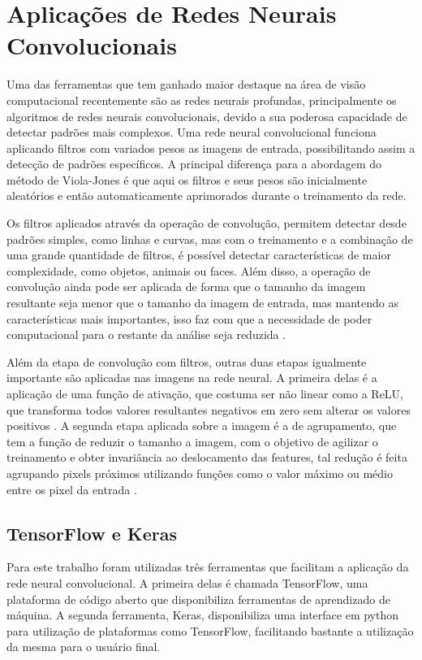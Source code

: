 \section{Aplicações de Redes Neurais Convolucionais}

Uma das ferramentas que tem ganhado maior destaque na área de visão computacional recentemente são as redes neurais profundas, principalmente os algoritmos de redes neurais convolucionais, devido a sua poderosa capacidade de detectar padrões mais complexos. \cite{gu2018recent} Uma rede neural convolucional funciona aplicando filtros com variados pesos as imagens de entrada, possibilitando assim a detecção de padrões específicos. A principal diferença para a abordagem do método de Viola-Jones é que aqui os filtros e seus pesos são inicialmente aleatórios e então automaticamente aprimorados durante o treinamento da rede.

Os filtros aplicados através da operação de convolução, permitem detectar desde padrões simples, como linhas e curvas, mas com o treinamento e a combinação de uma grande quantidade de filtros, é possível detectar características de maior complexidade, como objetos, animais ou faces. Além disso, a operação de convolução ainda pode ser aplicada de forma que o tamanho da imagem resultante seja menor que o tamanho da imagem de entrada, mas mantendo as características mais importantes, isso faz com que a necessidade de poder computacional para o restante da análise seja reduzida \cite{cnn_face_detection}.

Além da etapa de convolução com filtros, outras duas etapas igualmente importante são aplicadas nas imagens na rede neural. A primeira delas é a aplicação de uma função de ativação, que costuma ser não linear como a ReLU, que transforma todos valores resultantes negativos em zero sem alterar os valores positivos \cite{relu_ide2017improvement}. A segunda etapa aplicada sobre a imagem é a de agrupamento, que tem a função de reduzir o tamanho a imagem, com o objetivo de agilizar o treinamento e obter invariância ao deslocamento das features, tal redução é feita agrupando pixels próximos utilizando funções como o valor máximo ou médio entre os pixel da entrada \cite{vargas2016estudo}.

\subsection{TensorFlow e Keras}

Para este trabalho foram utilizadas três ferramentas que facilitam a aplicação da rede neural convolucional. A primeira delas é chamada TensorFlow, uma plataforma de código aberto que disponibiliza ferramentas de aprendizado de máquina. A segunda ferramenta, Keras, disponibiliza uma interface em python para utilização de plataformas como TensorFlow, facilitando bastante a utilização da mesma para o usuário final.

